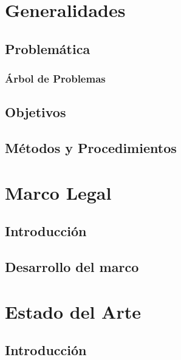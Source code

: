 \documentclass{report}
\begin{document}


\begin{abstract}

\end{abstract}

\tableofcontents

\cleardoublepage{}
\listoffigures

\cleardoublepage{}
\listoftables


\chapter{Generalidades}
\section{Problemática}
\subsection{Árbol de Problemas}
\section{Objetivos}
\section{Métodos y Procedimientos}

\chapter{Marco Legal}
\section{Introducción}
\section{Desarrollo del marco}


\chapter{Estado del Arte}

\section{Introducción}
\end{document}
